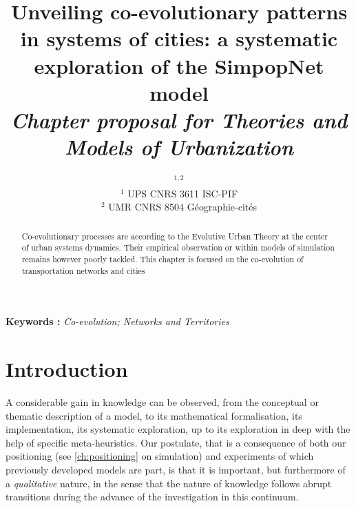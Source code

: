 


\title{Unveiling co-evolutionary patterns in systems of cities: a systematic exploration of the SimpopNet model
\\\medskip
\textit{Chapter proposal for Theories and Models of Urbanization}
}
\author{$^{1,2}$\\
$^1$ UPS CNRS 3611 ISC-PIF\\
$^2$ UMR CNRS 8504 G{\'e}ographie-cit{\'e}s
}
\date{}

\maketitle

\justify



\begin{abstract}
Co-evolutionary processes are according to the Evolutive Urban Theory at the center of urban systems dynamics. Their empirical observation or within models of simulation remains however poorly tackled. This chapter is focused on the co-evolution of transportation networks and cities
\end{abstract}

\textbf{Keywords : }\textit{Co-evolution; Networks and Territories}




\section{Introduction}


A considerable gain in knowledge can be observed, from the conceptual or thematic description of a model, to its mathematical formalisation, its implementation, its systematic exploration, up to its exploration in deep with the help of specific meta-heuristics. Our postulate, that is a consequence of both our positioning (see \ref{ch:positioning} on simulation) and experiments of which previously developed models are part, is that it is important, but furthermore of a \emph{qualitative} nature, in the sense that the nature of knowledge follows abrupt transitions during the advance of the investigation in this continuum.


